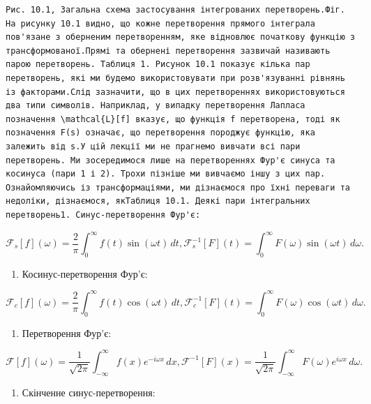 \documentclass[
  ukrainian,
]{article}
\providecommand{\tightlist}{%
  \setlength{\itemsep}{0pt}\setlength{\parskip}{0pt}}
\begin{document}
\begin{verbatim}
Рис. 10.1, Загальна схема застосування інтегрованих перетворень.Фіг. На рисунку 10.1 видно, що кожне перетворення прямого інтеграла пов'язане з оберненим перетворенням, яке відновлює початкову функцію з трансформованої.Прямі та обернені перетворення зазвичай називають парою перетворень. Таблиця 1. Рисунок 10.1 показує кілька пар перетворень, які ми будемо використовувати при розв'язуванні рівнянь із факторами.Слід зазначити, що в цих перетвореннях використовуються два типи символів. Наприклад, у випадку перетворення Лапласа позначення \mathcal{L}[f] вказує, що функція f перетворена, тоді як позначення F(s) означає, що перетворення породжує функцію, яка залежить від s.У цій лекції ми не прагнемо вивчати всі пари перетворень. Ми зосередимося лише на перетвореннях Фур'є синуса та косинуса (пари 1 і 2). Трохи пізніше ми вивчаємо іншу з цих пар. Ознайомляючись із трансформаціями, ми дізнаємося про їхні переваги та недоліки, дізнаємося, якТаблиця 10.1. Деякі пари інтегральних перетворень1. Синус-перетворення Фур'є:
\end{verbatim}

\[
\mathcal{F}_s[f](\omega) = \frac{2}{\pi}\int_0^\infty f(t)\sin(\omega t)\,dt,
\mathcal{F}_s^{-1}[F](t) = \int_0^\infty F(\omega)\sin(\omega t)\,d\omega.
\]

\begin{enumerate}
\def\labelenumi{\arabic{enumi}.}
\setcounter{enumi}{1}
\tightlist
\item
  Косинус-перетворення Фур'є:
\end{enumerate}

\[
\mathcal{F}_c[f](\omega) = \frac{2}{\pi}\int_0^\infty f(t)\cos(\omega t)\,dt,
\mathcal{F}_c^{-1}[F](t) = \int_0^\infty F(\omega)\cos(\omega t)\,d\omega.
\]

\begin{enumerate}
\def\labelenumi{\arabic{enumi}.}
\setcounter{enumi}{2}
\tightlist
\item
  Перетворення Фур'є:
\end{enumerate}

\[
\mathcal{F}[f](\omega) = \frac{1}{\sqrt{2\pi}}\int_{-\infty}^{\infty} f(x)e^{-i\omega x}\,dx,
\mathcal{F}^{-1}[F](x) = \frac{1}{\sqrt{2\pi}}\int_{-\infty}^{\infty} F(\omega)e^{i\omega x}\,d\omega.
\]

\begin{enumerate}
\def\labelenumi{\arabic{enumi}.}
\setcounter{enumi}{3}
\tightlist
\item
  Скінченне синус-перетворення:
\end{enumerate}
\end{document}
